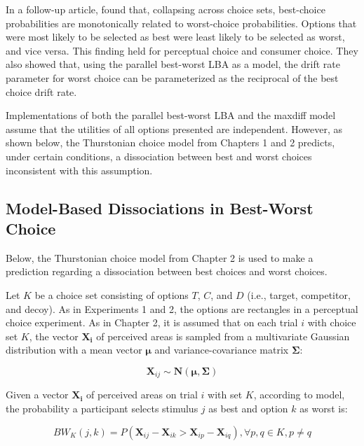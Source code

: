 In a follow-up article, \textcite{hawkinsBestTimesWorst2014} found that, collapsing across choice sets, best-choice probabilities are monotonically related to worst-choice probabilities. Options that were most likely to be selected as best were least likely to be selected as worst, and vice versa. This finding held for perceptual choice and consumer choice. They also showed that, using the parallel best-worst LBA as a model, the drift rate parameter for worst choice can be parameterized as the reciprocal of the best choice drift rate. 

Implementations of both the parallel best-worst LBA and the maxdiff model assume that the utilities of all options presented are independent. However, as shown below, the Thurstonian choice model from Chapters 1 and 2 predicts, under certain conditions, a dissociation between best and worst choices inconsistent with this assumption.

\subsection{Model-Based Dissociations in Best-Worst Choice}

Below, the Thurstonian choice model from Chapter 2 is used to make a prediction regarding a dissociation between best choices and worst choices. 

Let $K$ be a choice set consisting of options $T$, $C$, and $D$ (i.e., target, competitor, and decoy). As in Experiments 1 and 2, the options are rectangles in a perceptual choice experiment. As in Chapter 2, it is assumed that on each trial $i$ with choice set $K$, the vector $\mathbf{X_{i}}$ of perceived areas is sampled from a multivariate Gaussian distribution with a mean vector $\boldsymbol{\mu}$ and variance-covariance matrix $\boldsymbol{\Sigma}$:

\begin{equation}
   \boldsymbol{X}_{ij} \sim \mathcal{\boldsymbol{N}}(\boldsymbol{\mu},\boldsymbol{\Sigma})
   \label{eqn:bw_thurstone_dist}
\end{equation}

Given a vector $\mathbf{X_{i}}$ of perceived areas on trial $i$ with set $K$, according to model, the probability a participant selects stimulus $j$ as best and option $k$ as worst is:

\begin{equation}
   BW_{K}(j,k)=P(\mathbf{X}_{ij}-\mathbf{X}_{ik} > \mathbf{X}_{ip}-\mathbf{X}_{iq}), \forall p, q \in K, p \neq q
   \label{eqn:bw_thurstone_equation}
\end{equation}

